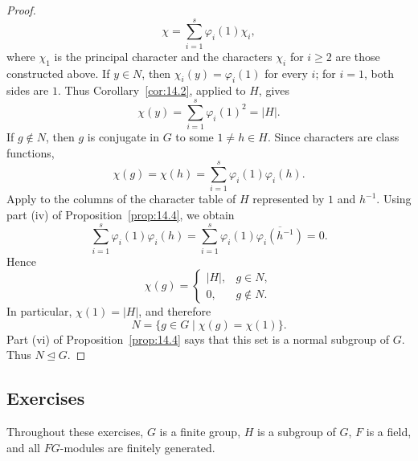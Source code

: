 \documentclass[../Odyssey_Project.tex]{subfiles}
\begin{document}
\begin{proof}
\[        \chi=\sum_{i=1}^{s}\varphi_i(1)\chi_i,
    \]
    where $\chi_1$ is the principal character and the characters $\chi_i$ for $i\geq2$ are those constructed above. If $y\in N$, then $\chi_i(y)=\varphi_i(1)$ for every $i$; for $i=1$, both sides are $1$. Thus Corollary~\ref{cor:14.2}, applied to $H$, gives
    \[
        \chi(y)
        =
        \sum_{i=1}^{s}\varphi_i(1)^2
        =
        |H|.
    \]
    If $g\notin N$, then $g$ is conjugate in $G$ to some $1\neq h\in H$. Since characters are class functions,
    \[
        \chi(g)
        =
        \chi(h)
        =
        \sum_{i=1}^{s}\varphi_i(1)\varphi_i(h).
    \]
    Apply  to the columns of the character table of $H$ represented by $1$ and $h^{-1}$. Using part (iv) of Proposition~\ref{prop:14.4}, we obtain
    \[
        \sum_{i=1}^{s}\varphi_i(1)\varphi_i(h)
        =
        \sum_{i=1}^{s}\varphi_i(1)\overline{\varphi_i(h^{-1})}
        =
        0.
    \]
    Hence
    \[
        \chi(g)
        =
        \begin{cases}
            |H|,&g\in N,\\
            0,&g\notin N.
        \end{cases}
    \]
    In particular, $\chi(1)=|H|$, and therefore
    \[
        N=\{g\in G\mid\chi(g)=\chi(1)\}.
    \]
    Part (vi) of Proposition~\ref{prop:14.4} says that this set is a normal subgroup of $G$. Thus $N\trianglelefteq G$.
\end{proof}

\subsection*{Exercises}

\noindent Throughout these exercises, $G$ is a finite group, $H$ is a subgroup of $G$, $F$ is a field, and all $FG$-modules are finitely generated.
\end{document}
